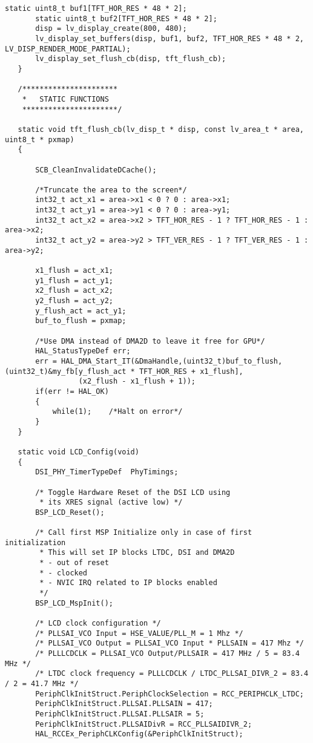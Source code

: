 \begin{lstlisting}[captionpos=t, caption={Fichero \texttt{tft.c}}]
       static uint8_t buf1[TFT_HOR_RES * 48 * 2];
       static uint8_t buf2[TFT_HOR_RES * 48 * 2];
       disp = lv_display_create(800, 480);
       lv_display_set_buffers(disp, buf1, buf2, TFT_HOR_RES * 48 * 2, LV_DISP_RENDER_MODE_PARTIAL);
       lv_display_set_flush_cb(disp, tft_flush_cb);
   }
   
   /**********************
    *   STATIC FUNCTIONS
    **********************/
   
   static void tft_flush_cb(lv_disp_t * disp, const lv_area_t * area, uint8_t * pxmap)
   {
   
       SCB_CleanInvalidateDCache();
   
       /*Truncate the area to the screen*/
       int32_t act_x1 = area->x1 < 0 ? 0 : area->x1;
       int32_t act_y1 = area->y1 < 0 ? 0 : area->y1;
       int32_t act_x2 = area->x2 > TFT_HOR_RES - 1 ? TFT_HOR_RES - 1 : area->x2;
       int32_t act_y2 = area->y2 > TFT_VER_RES - 1 ? TFT_VER_RES - 1 : area->y2;
   
       x1_flush = act_x1;
       y1_flush = act_y1;
       x2_flush = act_x2;
       y2_flush = act_y2;
       y_flush_act = act_y1;
       buf_to_flush = pxmap;
   
       /*Use DMA instead of DMA2D to leave it free for GPU*/
       HAL_StatusTypeDef err;
       err = HAL_DMA_Start_IT(&DmaHandle,(uint32_t)buf_to_flush, (uint32_t)&my_fb[y_flush_act * TFT_HOR_RES + x1_flush],
                 (x2_flush - x1_flush + 1));
       if(err != HAL_OK)
       {
           while(1);	/*Halt on error*/
       }
   }
   
   static void LCD_Config(void)
   {
       DSI_PHY_TimerTypeDef  PhyTimings;
   
       /* Toggle Hardware Reset of the DSI LCD using
        * its XRES signal (active low) */
       BSP_LCD_Reset();
   
       /* Call first MSP Initialize only in case of first initialization
        * This will set IP blocks LTDC, DSI and DMA2D
        * - out of reset
        * - clocked
        * - NVIC IRQ related to IP blocks enabled
        */
       BSP_LCD_MspInit();
   
       /* LCD clock configuration */
       /* PLLSAI_VCO Input = HSE_VALUE/PLL_M = 1 Mhz */
       /* PLLSAI_VCO Output = PLLSAI_VCO Input * PLLSAIN = 417 Mhz */
       /* PLLLCDCLK = PLLSAI_VCO Output/PLLSAIR = 417 MHz / 5 = 83.4 MHz */
       /* LTDC clock frequency = PLLLCDCLK / LTDC_PLLSAI_DIVR_2 = 83.4 / 2 = 41.7 MHz */
       PeriphClkInitStruct.PeriphClockSelection = RCC_PERIPHCLK_LTDC;
       PeriphClkInitStruct.PLLSAI.PLLSAIN = 417;
       PeriphClkInitStruct.PLLSAI.PLLSAIR = 5;
       PeriphClkInitStruct.PLLSAIDivR = RCC_PLLSAIDIVR_2;
       HAL_RCCEx_PeriphCLKConfig(&PeriphClkInitStruct);
   

\end{lstlisting}
